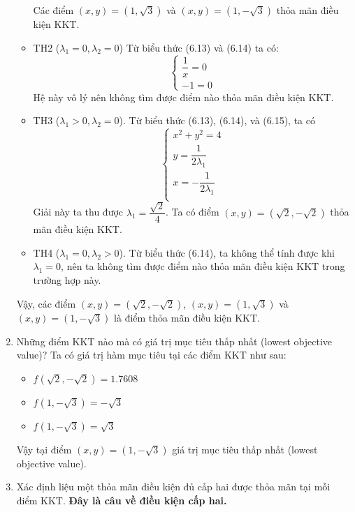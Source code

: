 \begin{solution}
\begin{enumerate}[label=(\alph*)]
\begin{itemize}
\begin{equation}
            \end{equation}
            Các điểm $(x, y) = (1, \sqrt{3})$ và $(x, y) = (1, -\sqrt{3})$ thỏa mãn điều kiện KKT.
            \item TH2 ($\lambda_1 = 0, \lambda_2 = 0$)
            Từ biểu thức (6.13) và (6.14) ta có:
            \begin{equation}
                \begin{cases}
                    \dfrac{1}{x} = 0\\
                    -1 = 0
                \end{cases}
            \end{equation}
            Hệ này vô lý nên không tìm được điểm nào thỏa mãn điều kiện KKT.
            \item TH3 ($\lambda_1 > 0, \lambda_2 = 0$). Từ biểu thức (6.13), (6.14), và (6.15), ta có
            \begin{equation}
                \begin{cases}
                    x^2 + y^2 = 4\\ 
                    y = \dfrac{1}{2\lambda_1}\\
                    x = -\dfrac{1}{2\lambda_1}\\
                \end{cases}
            \end{equation}
            Giải này ta thu được $\lambda_1 = \dfrac{\sqrt{2}}{4}$. Ta có điểm $(x, y) = (\sqrt{2}, -\sqrt{2})$ thỏa mãn điều kiện KKT.
            \item TH4 ($\lambda_1 = 0, \lambda_2 > 0$). Từ biểu thức (6.14), ta không thể tính được khi $\lambda_1 = 0$, nên ta không tìm được điểm nào thỏa mãn điều kiện KKT trong trường hợp này.
        \end{itemize}
        Vậy, các điểm $(x, y) = (\sqrt{2}, -\sqrt{2})$, $(x, y) = (1, \sqrt{3})$ và $(x, y) = (1, -\sqrt{3})$ là điểm thỏa mãn điều kiện KKT.
        \item Những điểm KKT nào mà có giá trị mục tiêu thấp nhất (lowest objective value)? Ta có giá trị hàm mục tiêu tại các điểm KKT như sau:
        \begin{itemize}
            \item $f(\sqrt{2}, -\sqrt{2}) = 1.7608$
            \item $f(1, -\sqrt{3}) = -\sqrt{3}$
            \item $f(1, -\sqrt{3}) = \sqrt{3}$
        \end{itemize}
        Vậy tại điểm $(x,y) = (1, -\sqrt{3})$ giá trị mục tiêu thấp nhất (lowest objective value).
        \item Xác định liệu một thỏa mãn điều kiện đủ cấp hai được thỏa mãn tại mỗi điểm KKT. \textbf{Đây là câu về điều kiện cấp hai.}
    \end{enumerate}
\end{solution}